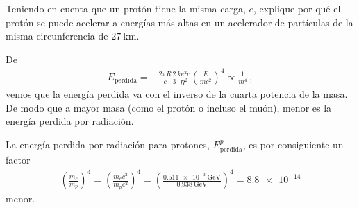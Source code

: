 \documentclass[12pt, a4paper]{article}
\begin{document}
\begin{exercise}[ID=lep-proton, tags={banco}]
Teniendo en cuenta que un protón tiene la misma carga, $e$, explique por qué el protón se puede acelerar a energías más altas en un acelerador de partículas de la misma circunferencia de $\qty{27}{\kilo\meter}$.
\end{exercise}
\begin{solution}
De
\begin{align*}
    E_{\text{perdida}} =&\frac{2\pi R}{c} \frac{2}{3} \frac{k e^2 c}{R^2}\left(\frac{E}{m c^2}\right)^4\propto \frac{1}{m^4}\,,
\end{align*}
vemos que la energía perdida va con el inverso de la cuarta potencia de la masa. De modo que a mayor masa (como el protón o incluso el muón), menor es la energía perdida por radiación.

La energía perdida por radiación para protones, $E^p_{\text{perdida}}$, es por consiguiente un factor
\begin{align*}
    \left(\frac{m_e}{m_p}\right)^4 =  \left(\frac{m_e c^2}{m_p c^2}\right)^4
    = \left(\frac{\qty{0.511e-3}{\giga\electronvolt}}{\qty{0.938}{\giga\electronvolt}}\right)^4
    = \num{8.8e-14}
\end{align*}
menor.
\end{solution}
\end{document}
